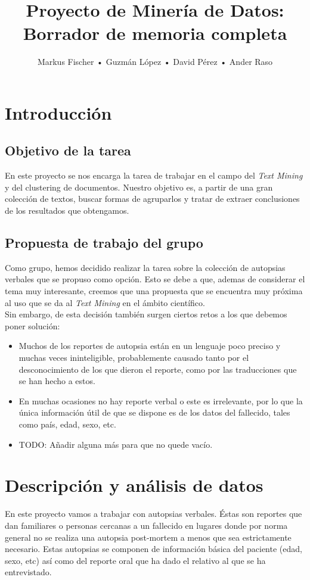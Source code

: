 \documentclass[10pt,a4paper,draft]{article}
\author{Markus Fischer • Guzmán López • David Pérez • Ander Raso}
\title{Proyecto de Minería de Datos: \linebreak Borrador de memoria completa}
\date{}
\begin{document}
\maketitle

\section{Introducción}
	\subsection{Objetivo de la tarea}
	En este proyecto se nos encarga la tarea de trabajar en el campo del \textit{Text Mining} y del clustering de documentos. Nuestro objetivo es, a partir de una gran colección de textos, buscar formas de agruparlos y tratar de extraer conclusiones de los resultados que obtengamos.
	\subsection{Propuesta de trabajo del grupo}
	Como grupo, hemos decidido realizar la tarea sobre la colección de autopsias verbales que se propuso como opción. Esto se debe a que, ademas de considerar el tema muy interesante, creemos que  una propuesta que se encuentra muy próxima al uso que se da al \textit{Text Mining} en el ámbito científico.\\
	
	Sin embargo, de esta decisión también surgen ciertos retos a los que debemos poner solución:
	\begin{itemize}
	\item Muchos de los reportes de autopsia están en un lenguaje poco preciso y muchas veces ininteligible, probablemente causado tanto por el desconocimiento de los que dieron el reporte, como por las traducciones que se han hecho a estos.
	\item En muchas ocasiones no hay reporte verbal o este es irrelevante, por lo que la única información útil de que se dispone es de los datos del fallecido, tales como país, edad, sexo, etc.
	\item TODO: Añadir alguna más para que no quede vacío.
	\end{itemize}

\section{Descripción y análisis de datos}
En este proyecto vamos a trabajar con autopsias verbales. Éstas son reportes que dan familiares o personas cercanas a un fallecido en lugares donde por norma general no se realiza una autopsia post-mortem a menos que sea estrictamente necesario. Estas autopsias se componen de información básica del paciente (edad, sexo, etc) así como del reporte oral que ha dado el relativo al que se ha entrevistado.\\
\end{document}
